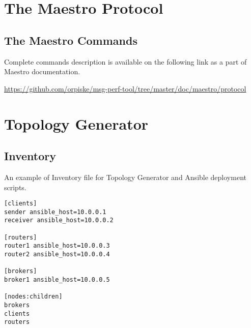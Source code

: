

\chapter{The Maestro Protocol}

\section{The Maestro Commands}
\label{AP:commands}
Complete commands description is available on the following link as a part of Maestro documentation.

\url{https://github.com/orpiske/msg-perf-tool/tree/master/doc/maestro/protocol}

\chapter{Topology Generator} %

\section{Inventory}
\label{AP:Inventory}
An example of Inventory file for Topology Generator and Ansible deployment scripts.

\begin{verbatim}
[clients]
sender ansible_host=10.0.0.1
receiver ansible_host=10.0.0.2

[routers]
router1 ansible_host=10.0.0.3
router2 ansible_host=10.0.0.4

[brokers]
broker1 ansible_host=10.0.0.5

[nodes:children]
brokers
clients
routers
\end{verbatim}

